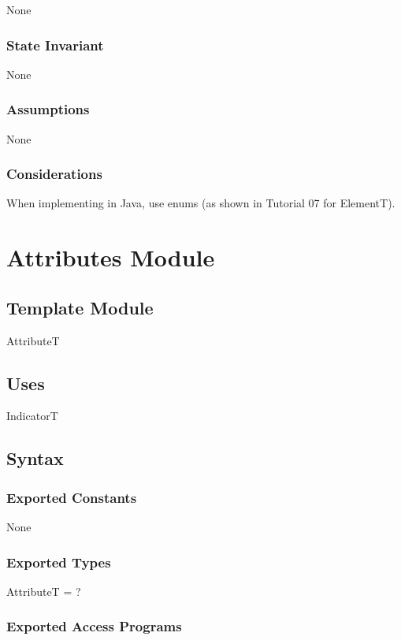 \documentclass[12pt]{article}
\begin{document}
None

\subsubsection* {State Invariant}

None

\subsubsection* {Assumptions}

None

\subsubsection* {Considerations}

When implementing in Java, use enums (as shown in Tutorial 07 for ElementT).

\newpage

\section* {Attributes Module}

\subsection*{Template Module}

AttributeT

\subsection* {Uses}

IndicatorT

\subsection* {Syntax}

\subsubsection* {Exported Constants}

None

\subsubsection* {Exported Types}

AttributeT = ?

\subsubsection* {Exported Access Programs}
\end{document}
